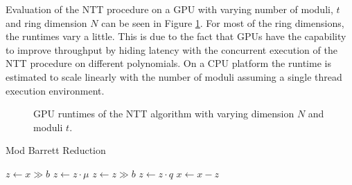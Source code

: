 Evaluation of the NTT procedure on a GPU with varying number of moduli, $t$ and ring dimension $N$ can be seen in Figure \ref{fig:gpuRunTimesOnModuli}. For most of the ring dimensions, the runtimes vary a little. This is due to the fact that GPUs have the capability to improve throughput by hiding latency with the concurrent execution of the NTT procedure on different polynomials. On a CPU platform the runtime is estimated to scale linearly with the number of moduli assuming a single thread execution environment.



\begin{figure}
\centering
{}
\caption{GPU runtimes of the NTT algorithm with varying dimension $N$ and moduli $t$.}
\label{fig:gpuRunTimesOnModuli}
\end{figure}  



\begin{algorithm}
\caption{Mod Barrett Reduction}
\label{algo:modBarrett}
	\SetAlgoLined
	$z \gets x \gg b$ \;
	$z \gets z\cdot \mu$ \;
	$z \gets z \gg b$ \;
	$z \gets z\cdot q$ \; 
	$x \gets x - z$ \;
\end{algorithm}

